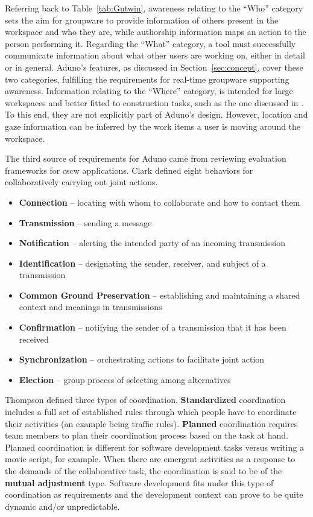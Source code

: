 \documentclass[conference]{IEEEtran}
\begin{document}
Referring back to Table~\ref{tab:Gutwin}, awareness relating to the ``Who'' category sets the aim for groupware to provide information of others present in the workspace and who they are, while authorship information maps an action to the person performing it. Regarding the ``What'' category, a tool must successfully communicate information about what other users are working on, either in detail or in general. Aduno's features, as discussed in Section~\ref{sec:concept}, cover these two categories, fulfilling the requirements for real-time groupware supporting awareness. Information relating to the ``Where'' category, is intended for large workspaces and better fitted to construction tasks, such as the one discussed in \cite{GRG96}. To this end, they are not explicitly part of Aduno's design. However, location and gaze information can be inferred by the work items a user is moving around the workspace.

The third source of requirements for Aduno came from reviewing evaluation frameworks for {\sc cscw} applications. Clark \cite{Clark96} defined eight behaviors for collaboratively carrying out joint actions.

\begin{itemize}
\item \textbf{Connection} -- locating with whom to collaborate and how to contact them
\item \textbf{Transmission} -- sending a message
\item \textbf{Notification} -- alerting the intended party of an incoming transmission
\item \textbf{Identification} -- designating the sender, receiver, and subject of a transmission
\item \textbf{Common Ground Preservation} -- establishing and maintaining a shared context and meanings in transmissions
\item \textbf{Confirmation} -- notifying the sender of a transmission that it has been received
\item \textbf{Synchronization} -- orchestrating actions to facilitate joint action
\item \textbf{Election} -- group process of selecting among alternatives
\end{itemize}

Thompson \cite{Thompson67} defined three types of coordination. \textbf{Standardized} coordination includes a full set of established rules through which people have to coordinate their activities (an example being traffic rules). \textbf{Planned} coordination requires team members to plan their coordination process based on the task at hand. Planned coordination is different for software development tasks versus writing a movie script, for example. When there are emergent activities as a response to the demands of the collaborative task, the coordination is said to be of the \textbf{mutual adjustment} type. Software development fits under this type of coordination as requirements and the development context can prove to be quite dynamic and/or unpredictable.
\end{document}
